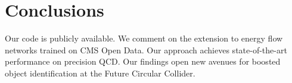 \section{Conclusions}\label{sec:conclusions}

Our code is publicly available. We comment on the extension to energy
flow networks trained on CMS Open Data. Our approach achieves
state-of-the-art performance on precision QCD. Our findings open new
avenues for boosted object identification at the Future Circular
Collider.

